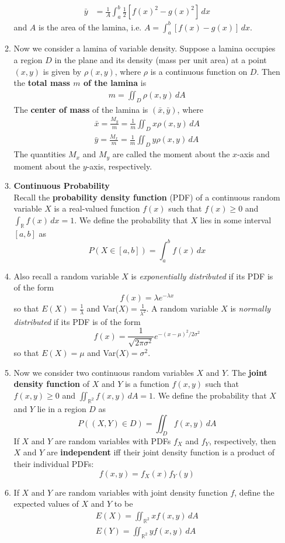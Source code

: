 \documentclass[10pt]{article}
\begin{document}
\begin{multicols*}{2}
\begin{enumerate}
\begin{enumerate}
\begin{align*}
            \bar{y} &= \frac{1}{A} \int_a^b \frac{1}{2} [f(x)^2 - g(x)^2] \,dx\textbf{}
        \end{align*}
        and $A$ is the area of the lamina, i.e. $A=\int_a^b [f(x) - g(x)] \,dx$. 
    \item Now we consider a lamina of variable density. Suppose a lamina occupies a region $D$ in the plane and its density (mass per unit area) at a point $(x,y)$ is given by $\rho(x,y)$, where $\rho$ is a continuous function on $D$. Then the \textbf{total mass $m$ of the lamina} is 
    \begin{align*}
        m = \iint_D \rho(x,y) \,dA
    \end{align*}
   The \textbf{center of mass} of the lamina is $(\bar{x}, \bar{y})$, where
   \begin{align*}
       \bar{x} = \frac{M_y}{m} = \frac{1}{m} \iint_D x \rho(x,y) \,dA \\
       \bar{y} = \frac{M_x}{m} = \frac{1}{m} \iint_D y \rho(x,y) \,dA 
   \end{align*}
   The quantities $M_x$ and $M_y$ are called the moment about the $x$-axis and moment about the $y$-axis, respectively.
   \item \textbf{Continuous Probability} \\ Recall the \textbf{probability density function} (PDF) of a continuous random variable $X$ is a real-valued function $f(x)$ such that $f(x) \geq 0$ and $\int_{\mathbb{R}} f(x) \,dx=1$. We define the probability that $X$ lies in some interval $[a,b]$ as $$P(X \in [a,b]) = \int_a^b f(x) \,dx$$
   \item Also recall a random variable $X$ is \textit{exponentially distributed} if its PDF is of the form $$f(x) = \lambda e^{-\lambda x}$$ so that $E(X) = \frac{1}{\lambda}$ and Var($X)=\frac{1}{\lambda^2}$. A random variable $X$ is \textit{normally distributed} if its PDF is of the form $$f(x) = \frac{1}{\sqrt{2\pi\sigma^2}}e^{-(x-\mu)^2 / 2\sigma^2}$$ so that $E(X)=\mu$ and Var($X)=\sigma^2$.
   \item Now we consider two continuous random variables $X$ and $Y$. The \textbf{joint density function} of $X$ and $Y$ is a function $f(x,y)$ such that $f(x,y) \geq 0$ and $\iint_{\mathbb{R}^2} f(x,y) \,dA = 1$. We define the probability that $X$ and $Y$ lie in a region $D$ as 
   $$P((X,Y) \in D) = \iint_D f(x,y) \,dA$$
   If $X$ and $Y$ are random variables with PDFs $f_X$ and $f_Y$, respectively, then $X$ and $Y$ are \textbf{independent} iff their joint density function is a product of their individual PDFs: $$f(x,y) = f_X(x) f_Y(y)$$
   \item If $X$ and $Y$ are random variables with joint density function $f$, define the expected values of $X$ and $Y$ to be
   \begin{align*}
       E(X) = \iint_{\mathbb{R}^2} x f(x,y) \,dA \\
       E(Y) = \iint_{\mathbb{R}^2} y f(x,y) \,dA 
   \end{align*}
    

\end{enumerate}
\end{enumerate}
\end{multicols*}
\end{document}
